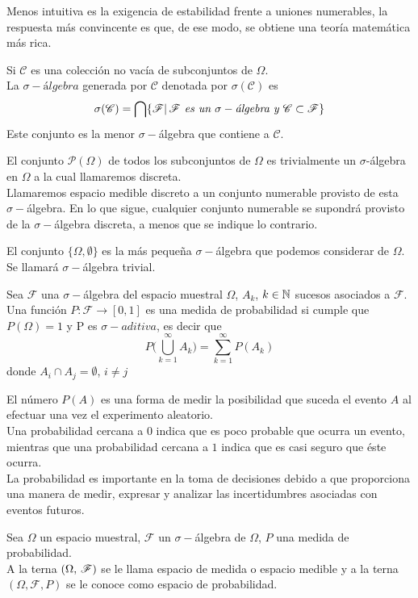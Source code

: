 Menos intuitiva es la exigencia de estabilidad frente a uniones numerables, la respuesta más
convincente es que, de ese modo, se obtiene una teoría matemática más rica.
\begin{Def}
    Si $\mathscr{C}$ es una colección no vacía de subconjuntos de $\Omega$.\\La $\sigma-\textit{álgebra}$ generada por $\mathscr{C}$ denotada por $\sigma(\mathscr{C})$ es $$\sigma(\mathscr{C})=\bigcap\{\mathscr{F}|\thinspace\mathscr{F} \textit{ es un }\sigma-\textit{álgebra y }  \mathscr{C}\subset\mathscr{F}\}$$
    Este conjunto es la menor $\sigma-$álgebra que contiene a $\mathscr{C}$.
\end{Def}
\begin{Ejm}
    El conjunto $\mathscr{P}(\Omega)$ de todos los subconjuntos de $\Omega$ es trivialmente un $\sigma$-álgebra en $\Omega$ a la cual llamaremos discreta. \\ Llamaremos espacio medible discreto a un conjunto numerable provisto de esta $\sigma-$álgebra. En lo que sigue, cualquier conjunto numerable se supondrá provisto de la $\sigma-$álgebra discreta, a menos que se indique lo contrario.
\end{Ejm}
\begin{Ejm}
    El conjunto $\{\Omega, \emptyset\}$ es la más pequeña $\sigma-$álgebra que podemos considerar de $\Omega$. Se llamará $\sigma-$álgebra trivial.
\end{Ejm}
\begin{Def}
    \label{def-medidaProbabilidad}
    Sea $\mathscr{F}$ una $\sigma-$álgebra del espacio muestral $\Omega$, $A_k$, $k\in{\mathbb{N}}$ sucesos asociados a $\mathscr{F}$.
    Una función $P:\mathscr{F}\rightarrow [0,1]$ es una medida de probabilidad si cumple que $P(\Omega)=1$ y P es $\sigma-aditiva$, es decir que $$P\big(\bigcup_{k=1}^\infty A_k\big)=\sum_{k=1}^\infty P(A_k)$$
    donde $A_i\cap A_j=\emptyset$, $i\not= j$
\end{Def}
El número $P(A)$ es una forma de medir la posibilidad que suceda el evento $A$ al efectuar una vez el experimento aleatorio.\\
Una probabilidad cercana a $0$ indica que es poco probable que ocurra un evento, mientras que una probabilidad cercana a $1$ indica que es casi seguro que éste ocurra.\\
La probabilidad es importante en la toma de decisiones debido a que proporciona una manera de medir, expresar y analizar las incertidumbres asociadas con eventos futuros.
\begin{Def}
    Sea $\Omega$ un espacio muestral, $\mathscr{F}$ un $\sigma-$álgebra de $\Omega$, $P$ una medida de probabilidad.\\
    A la terna $(\Omega,\thinspace\mathscr{F})$ se le llama espacio de medida o espacio medible y a la terna $(\Omega,\mathscr{F},P)$ se le conoce como espacio de probabilidad.
\end{Def}